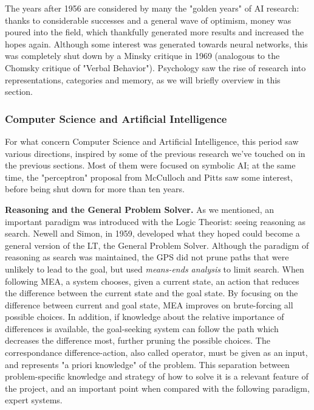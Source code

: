 \documentclass[../main.tex]{subfiles}
\begin{document}
The years after 1956 are considered by many the "golden years" of AI research: thanks to considerable successes and a general wave of optimism, money was poured into the field, which thankfully generated more results and increased the hopes again. Although some interest was generated towards neural networks, this was completely shut down by a Minsky critique in 1969 (analogous to the Chomsky critique of "Verbal Behavior"). Psychology saw the rise of research into representations, categories and memory, as we will briefly overview in this section.

\subsubsection{Computer Science and Artificial Intelligence}
For what concern Computer Science and Artificial Intelligence, this period saw various directions, inspired by some of the previous research we've touched on in the previous sections. Most of them were focused on symbolic AI; at the same time, the "perceptron" proposal from McCulloch and Pitts saw some interest, before being shut down for more than ten years.

\vspace{4pt}
\textbf{Reasoning and the General Problem Solver.} As we mentioned, an important paradigm was introduced with the Logic Theorist: seeing reasoning as search. Newell and Simon, in 1959, developed what they hoped could become a general version of the LT, the General Problem Solver. Although the paradigm of reasoning as search was maintained, the GPS did not prune paths that were unlikely to lead to the goal, but used \textit{means-ends analysis} to limit search. When following MEA, a system chooses, given a current state, an action that reduces the difference between the current state and the goal state. By focusing on the difference between current and goal state, MEA improves on brute-forcing all possible choices. In addition, if knowledge about the relative importance of differences is available, the goal-seeking system can follow the path which decreases the difference most, further pruning the possible choices. The correspondance difference-action, also called operator, must be given as an input, and represents "a priori knowledge" of the problem. This separation between problem-specific knowledge and strategy of how to solve it is a relevant feature of the project, and an important point when compared with the following paradigm, expert systems.
\end{document}
